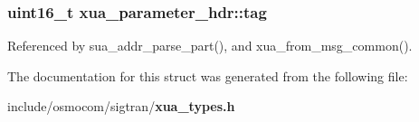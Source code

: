 \subsubsection[{tag}]{\setlength{\rightskip}{0pt plus 5cm}uint16\+\_\+t xua\+\_\+parameter\+\_\+hdr\+::tag}\label{structxua__parameter__hdr_ac64e07007c6c6f27d9e6432035f2339b}


Referenced by sua\+\_\+addr\+\_\+parse\+\_\+part(), and xua\+\_\+from\+\_\+msg\+\_\+common().



The documentation for this struct was generated from the following file\+:\begin{DoxyCompactItemize}
\item 
include/osmocom/sigtran/{\bf xua\+\_\+types.\+h}\end{DoxyCompactItemize}
